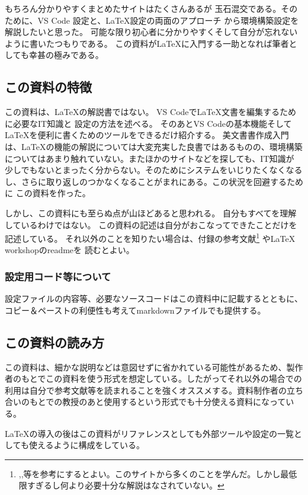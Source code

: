 \documentclass[titlepage]{ltjsarticle}
\begin{document}
もちろん分かりやすくまとめたサイトはたくさんあるが
玉石混交である。そのために、VS Code 設定と、\LaTeX 設定の両面のアプローチ
から環境構築設定を解説したいと思った。
可能な限り初心者に分かりやすくそして自分が忘れないように書いたつもりである。
この資料が\LaTeX に入門する一助となれば筆者としても幸甚の極みである。

\subsection{この資料の特徴}
この資料は、\LaTeX の解説書ではない。
VS Codeで\LaTeX 文書を編集するために必要なIT知識と
設定の方法を述べる。
そのあとVS Codeの基本機能そしてLaTeXを便利に書くためのツールをできるだけ紹介する。
美文書書作成入門\cite{美文書本}は、\LaTeX の機能の解説については大変充実した良書ではあるものの、環境構築についてはあまり触れていない。またほかのサイトなどを探しても、IT知識が
少しでもないとまったく分からない。そのためにシステムをいじりたくなくなるし、さらに取り返しのつかなくなることがまれにある。この状況を回避するために
この資料を作った。

しかし、この資料にも至らぬ点が山ほどあると思われる。
自分もすべてを理解しているわけではない。
この資料の記述は自分がおこなってできたことだけを記述している。
それ以外のことを知りたい場合は、付録の参考文献\footnote{\cite{完全導入ガイド},\cite{最高の環境latex},\cite{platex}等を参考にするとよい。このサイトから多くのことを学んだ。しかし最低限すぎるし何より必要十分な解説はなされていない。}
やLaTeX workshopのreadme\cite{LaTeXworkshop_README}を
読むとよい。

\subsubsection{設定用コード等について}
設定ファイルの内容等、必要なソースコードはこの資料中に記載するとともに、コピー＆ペーストの利便性も考えてmarkdownファイルでも提供する。


\subsection{この資料の読み方}
この資料は、細かな説明などは意図せずに省かれている可能性があるため、製作者のもとでこの資料を使う形式を想定している。したがってそれ以外の場合での利用は自分で参考文献等を読まれることを強くオススメする。資料制作者の立ち合いのもとでの教授のあと使用するという形式でも十分使える資料になっている。

\LaTeX の導入の後はこの資料がリファレンスとしても外部ツールや設定の一覧としても使えるように構成をしている。
\end{document}
